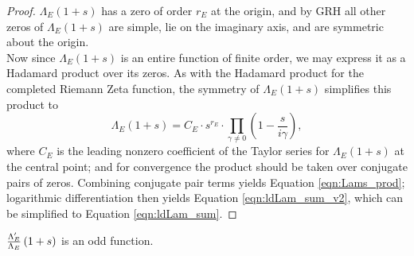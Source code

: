 \begin{proof}
$\Lambda_E(1+s)$ has a zero of order $r_E$ at the origin, and by GRH all other zeros of $\Lambda_E(1+s)$ are simple, lie on the imaginary axis, and are symmetric about the origin. \\

Now since $\Lambda_E(1+s)$ is an entire function of finite order, we may express it as a Hadamard product over its zeros. As with the Hadamard product for the completed Riemann Zeta function, the symmetry of $\Lambda_E(1+s)$ simplifies this product to
\begin{equation}
\Lambda_E(1+s) = C_E \cdot s^{r_E}\cdot \prod_{\gamma\ne0}\left(1-\frac{s}{i\gamma}\right),
\end{equation}
where $C_E$ is the leading nonzero coefficient of the Taylor series for $\Lambda_E(1+s)$ at the central point; and for convergence the product should be taken over conjugate pairs of zeros. Combining conjugate pair terms yields Equation \ref{eqn:Lams_prod}; logarithmic differentiation then yields Equation \ref{eqn:ldLam_sum_v2}, which can be simplified to Equation \ref{eqn:ldLam_sum}.
\end{proof}

\begin{corollary}
$\frac{\Lambda_E^{\prime}}{\Lambda_E}\left(1+s\right)$ is an odd function.
\end{corollary}

